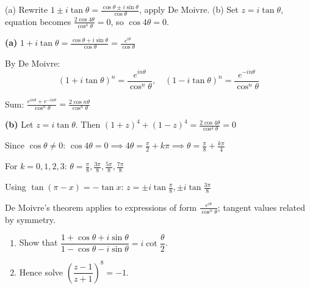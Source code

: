 \vspace{0.5cm}
\begin{hintbox}
(a) Rewrite $1 \pm i\tan\theta = \frac{\cos\theta \pm i\sin\theta}{\cos\theta}$, apply De Moivre. (b) Set $z=i\tan\theta$, equation becomes $\frac{2\cos 4\theta}{\cos^4\theta}=0$, so $\cos 4\theta=0$.
\end{hintbox}

\begin{solution}
\textbf{(a)} $1 + i\tan\theta = \frac{\cos\theta + i\sin\theta}{\cos\theta} = \frac{e^{i\theta}}{\cos\theta}$

By De Moivre:
$$
(1 + i\tan\theta)^n = \frac{e^{in\theta}}{\cos^n\theta}, \quad (1 - i\tan\theta)^n = \frac{e^{-in\theta}}{\cos^n\theta}
$$

Sum: $\frac{e^{in\theta} + e^{-in\theta}}{\cos^n\theta} = \frac{2\cos n\theta}{\cos^n\theta}$

\textbf{(b)} Let $z = i\tan\theta$. Then $(1+z)^4 + (1-z)^4 = \frac{2\cos 4\theta}{\cos^4\theta} = 0$

Since $\cos\theta \neq 0$: $\cos 4\theta = 0 \implies 4\theta = \frac{\pi}{2} + k\pi \implies \theta = \frac{\pi}{8} + \frac{k\pi}{4}$

For $k=0,1,2,3$: $\theta = \frac{\pi}{8}, \frac{3\pi}{8}, \frac{5\pi}{8}, \frac{7\pi}{8}$

Using $\tan(\pi-x) = -\tan x$: $z = \pm i\tan\frac{\pi}{8}, \pm i\tan\frac{3\pi}{8}$

\end{solution}

\begin{takeaways}
De Moivre's theorem applies to expressions of form $\frac{e^{i\theta}}{\cos^n\theta}$; tangent values related by symmetry.
\end{takeaways}

\vspace{1cm}

\begin{problem}
\begin{enumerate}
    \item Show that $\dfrac{1+\cos \theta+i \sin \theta}{1-\cos \theta-i \sin \theta} = i \cot \dfrac{\theta}{2}$.
    \item Hence solve $\left(\dfrac{z-1}{z+1}\right)^8 = -1$.
\end{enumerate}
\end{problem}

